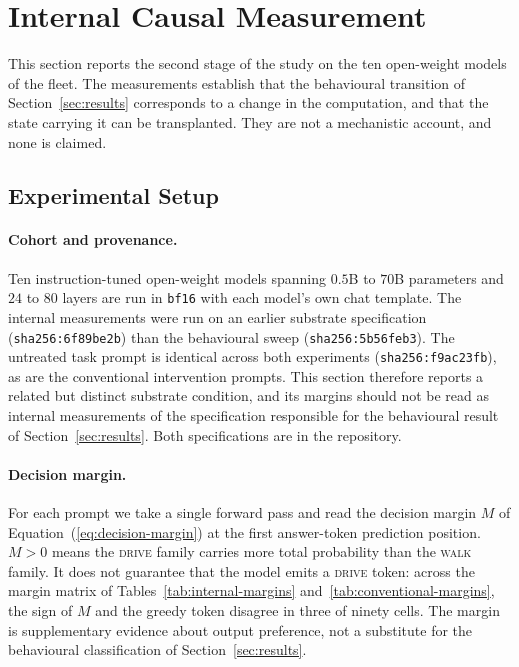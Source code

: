 \section{Internal Causal Measurement}
\label{sec:internal-experiments}

This section reports the second stage of the study on the ten open-weight models of
the fleet. The measurements establish that the behavioural transition of
Section~\ref{sec:results} corresponds to a change in the computation, and that the
state carrying it can be transplanted. They are not a mechanistic account, and none
is claimed.

\subsection{Experimental Setup}
\label{sec:internal-setup}

\paragraph{Cohort and provenance.}
Ten instruction-tuned open-weight models spanning $0.5$B to $70$B parameters and $24$
to $80$ layers are run in \texttt{bf16} with each model's own chat template. The
internal measurements were run on an earlier substrate specification
(\texttt{sha256:6f89be2b}) than the behavioural sweep (\texttt{sha256:5b56feb3}). The
untreated task prompt is identical across both experiments
(\texttt{sha256:f9ac23fb}), as are the conventional intervention prompts. This
section therefore reports a related but distinct substrate condition, and its
margins should not be read as internal measurements of the specification responsible
for the behavioural result of Section~\ref{sec:results}. Both specifications are in
the repository.

\paragraph{Decision margin.}
For each prompt we take a single forward pass and read the decision margin $M$ of
Equation~(\ref{eq:decision-margin}) at the first answer-token prediction position.
$M > 0$ means the \textsc{drive} family carries more total probability than the
\textsc{walk} family. It does not guarantee that the model emits a \textsc{drive}
token: across the margin matrix of Tables~\ref{tab:internal-margins}
and~\ref{tab:conventional-margins}, the sign of $M$ and the greedy token disagree in
three of ninety cells. The margin is supplementary evidence about output preference,
not a substitute for the behavioural classification of Section~\ref{sec:results}.

